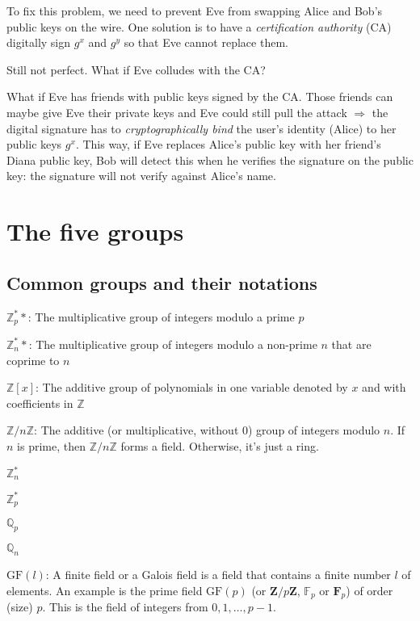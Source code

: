 \documentclass[12pt]{article}
\newcommand{\Zp}{\mathbb{Z}^{\ast}_p}
\newcommand{\Zn}{\mathbb{Z}^{\ast}_n}
\newcommand{\Znz}{\mathbb{Z}/n\mathbb{Z}}
\newcommand{\Qp}{\mathbb{Q}_p}
\newcommand{\Qn}{\mathbb{Q}_n}
\begin{document}
To fix this problem, we need to prevent Eve from swapping Alice and Bob's public
keys on the wire. One solution is to have a \emph{certification authority} (CA)
digitally sign $g^x$ and $g^y$ so that Eve cannot replace them.

\begin{note}
Still not perfect. What if Eve colludes with the CA?
\end{note}

\begin{note}
What if Eve has friends with public keys signed by the CA. Those friends can maybe give Eve their private keys and Eve could still pull the attack $\Rightarrow$ the
digital signature has to \emph{cryptographically bind} the user's identity (Alice)
to her public keys $g^x$. This way, if Eve replaces Alice's public key with
her friend's Diana public key, Bob will detect this when he verifies the signature
on the public key: the signature will not verify against Alice's name.
\end{note}

\section{The five groups}

\subsection{Common groups and their notations}

$\Zp*$: The multiplicative group of integers modulo a prime $p$

$\Zn*$: The multiplicative group of integers modulo a non-prime $n$ that are coprime to $n$

$\mathbb{Z}[x]$: The additive group of polynomials in one variable denoted by
$x$ and with coefficients in $\mathbb{Z}$

$\Znz$: The additive (or multiplicative, without $0$) group of integers
modulo $n$. If $n$ is prime, then $\Znz$ forms a field. Otherwise, it's just
a ring.

$\Zn$

$\Zp$

$\Qp$

$\Qn$

$\text{GF}(l)$: A finite field or a Galois field is a field that contains a
finite number $l$ of elements. An example is the prime field $\text{GF}(p)$ (or
$\pmb{\text{Z}}/p\pmb{\text{Z}}$, $\mathbb{F}_p$ or $\pmb{\text{F}}_p$) of order (size) $p$. This is the field of integers from $0, 1, \dots, p-1$.
\end{document}
